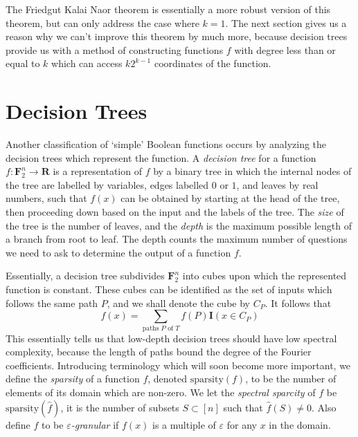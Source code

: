 The Friedgut Kalai Naor theorem is essentially a more robust version of this theorem, but can only address the case where $k = 1$. The next section gives us a reason why we can't improve this theorem by much more, because decision trees provide us with a method of constructing functions $f$ with degree less than or equal to $k$ which can access $k2^{k-1}$ coordinates of the function.




\section{Decision Trees}

Another classification of `simple' Boolean functions occurs by analyzing the decision trees which represent the function. A \emph{decision tree} for a function $f: \mathbf{F}_2^n \to \mathbf{R}$ is a representation of $f$ by a binary tree in which the internal nodes of the tree are labelled by variables, edges labelled $0$ or $1$, and leaves by real numbers, such that $f(x)$ can be obtained by starting at the head of the tree, then proceeding down based on the input and the labels of the tree. The \emph{size} of the tree is the number of leaves, and the \emph{depth} is the maximum possible length of a branch from root to leaf. The depth counts the maximum number of questions we need to ask to determine the output of a function $f$.

Essentially, a decision tree subdivides $\mathbf{F}_2^n$ into cubes upon which the represented function is constant. These cubes can be identified as the set of inputs which follows the same path $P$, and we shall denote the cube by $C_P$. It follows that
%
\[ f(x) = \sum_{\text{paths $P$ of $T$}} f(P) \mathbf{I}(x \in C_P) \]
%
This essentially tells us that low-depth decision trees should have low spectral complexity, because the length of paths bound the degree of the Fourier coefficients. Introducing terminology which will soon become more important, we define the \emph{sparsity} of a function $f$, denoted $\text{sparsity}(f)$, to be the number of elements of its domain which are non-zero. We let the \emph{spectral sparcity} of $f$ be $\text{sparsity}(\widehat{f})$, it is the number of subsets $S \subset [n]$ such that $\widehat{f}(S) \neq 0$. Also define $f$ to be \emph{$\varepsilon$-granular} if $f(x)$ is a multiple of $\varepsilon$ for any $x$ in the domain.

